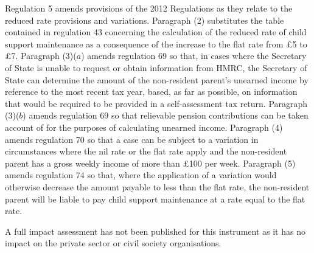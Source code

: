 \documentclass[12pt,a4paper]{article}
\begin{document}
Regulation 5 amends provisions of the 2012 Regulations as they relate to the reduced rate provisions and variations. Paragraph (2) substitutes the table contained in regulation 43 concerning the calculation of the reduced rate of child support maintenance as a consequence of the increase to the flat rate from £5 to £7. Paragraph (3)($a$)  amends regulation 69 so that, in cases where the Secretary of State is unable to request or obtain information from HMRC, the Secretary of State can determine the amount of the non-resident parent’s unearned income by reference to the most recent tax year, based, as far as possible, on information that would be required to be provided in a self-assessment tax return. Paragraph (3)($b$)  amends regulation 69 so that relievable pension contributions can be taken account of for the purposes of calculating unearned income. Paragraph (4) amends regulation 70 so that a case can be subject to a variation in circumstances where the nil rate or the flat rate apply and the non-resident parent has a gross weekly income of more than £100 per week. Paragraph (5) amends regulation 74 so that, where the application of a variation would otherwise decrease the amount payable to less than the flat rate, the non-resident parent will be liable to pay child support maintenance at a rate equal to the flat rate.

A full impact assessment has not been published for this instrument as it has no impact on the private sector or civil society organisations. 
\end{document}
